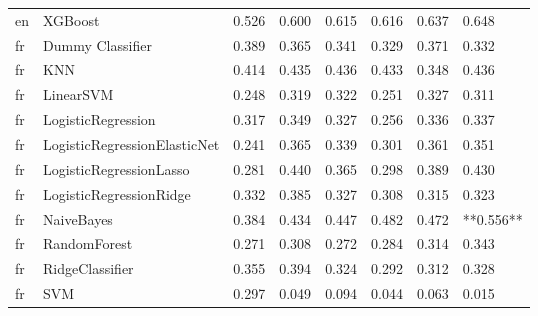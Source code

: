 \begin{tabular}{llllllll}
      en &                      XGBoost & 0.526 &                     0.600 &                 0.615 &                  0.616 &                                   0.637 &     0.648 \\
      fr &             Dummy Classifier & 0.389 &                     0.365 &                 0.341 &                  0.329 &                                   0.371 &     0.332 \\
      fr &                          KNN & 0.414 &                     0.435 &                 0.436 &                  0.433 &                                   0.348 &     0.436 \\
      fr &                    LinearSVM & 0.248 &                     0.319 &                 0.322 &                  0.251 &                                   0.327 &     0.311 \\
      fr &           LogisticRegression & 0.317 &                     0.349 &                 0.327 &                  0.256 &                                   0.336 &     0.337 \\
      fr & LogisticRegressionElasticNet & 0.241 &                     0.365 &                 0.339 &                  0.301 &                                   0.361 &     0.351 \\
      fr &      LogisticRegressionLasso & 0.281 &                     0.440 &                 0.365 &                  0.298 &                                   0.389 &     0.430 \\
      fr &      LogisticRegressionRidge & 0.332 &                     0.385 &                 0.327 &                  0.308 &                                   0.315 &     0.323 \\
      fr &                   NaiveBayes & 0.384 &                     0.434 &                 0.447 &                  0.482 &                                   0.472 & **0.556** \\
      fr &                 RandomForest & 0.271 &                     0.308 &                 0.272 &                  0.284 &                                   0.314 &     0.343 \\
      fr &              RidgeClassifier & 0.355 &                     0.394 &                 0.324 &                  0.292 &                                   0.312 &     0.328 \\
      fr &                          SVM & 0.297 &                     0.049 &                 0.094 &                  0.044 &                                   0.063 &     0.015 \\

\end{tabular}
